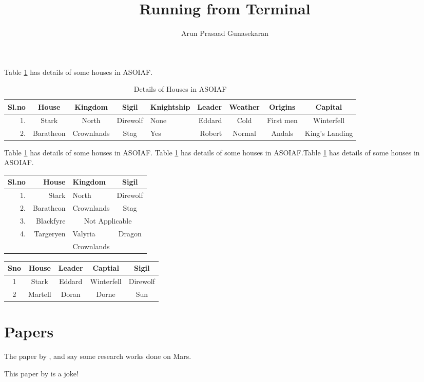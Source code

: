 \documentclass[10pt,a4paper]{article}
\author{Arun Prasaad Gunasekaran}
\title{Running from Terminal}
\begin{document}
\maketitle

Table \ref{Tab1} has details of some houses in ASOIAF.

\begin{table}[h]
\centering
\caption{Details of Houses in ASOIAF}
\label{Tab1}
\begin{tabular}{|r|c|c|c|l|r|c|c|c|}
\hline
Sl.no & House & Kingdom & Sigil & Knightship & Leader & Weather & Origins & Capital \\\hline
1. & Stark & North & Direwolf & None & Eddard & Cold & First men & Winterfell\\\hline \hline
2. & Baratheon & Crownlands & Stag & Yes & Robert & Normal & Andals & King's Landing\\\hline
\end{tabular}
\end{table}

Table \ref{Tab1} has details of some houses in ASOIAF. Table \ref{Tab1} has details of some houses in ASOIAF.Table \ref{Tab1} has details of some houses in ASOIAF.

\begin{table}[h]
\centering
\begin{tabular}{|r|r|l|c|}
\hline
Sl.no & House & Kingdom & Sigil \\\hline
1. & Stark & North & Direwolf \\\hline
2. & Baratheon & Crownlands & Stag \\\hline
3. & Blackfyre & \multicolumn{2}{c|}{Not Applicable}\\\hline
4. & Targeryen & Valyria & Dragon\\
\cline{2-3}
 &  & Crownlands & \\ \hline 

\end{tabular}
\end{table}

\begin{tabular}{|c||c||c|c||c||}
\hline 
Sno & House & Leader & Captial & Sigil \\ 
\hline 
1 & Stark & Eddard & Winterfell & Direwolf \\ 
\hline 
2 & Martell & Doran & Dorne & Sun \\ 
\hline 
\end{tabular}


\section{Papers}

The paper by \cite{forget_1991} , \cite{gierasch1968study} and \cite{conrath1975thermal} say some research works done on Mars.

This paper by \cite{ref_name} is a joke!


\end{document}
